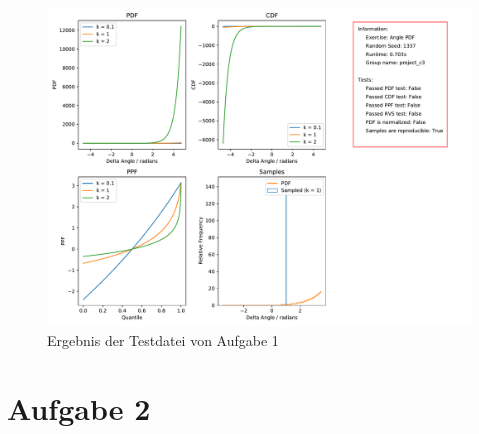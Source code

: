 \documentclass[11pt,a4paper]{article}
\begin{document}
	\begin{figure}[h]

		\centering

		\includegraphics[width=\textwidth]{exercise_angle_pdf.pdf}

		\caption{Ergebnis der Testdatei von Aufgabe 1}

	\end{figure}
\section*{Aufgabe 2}
\end{document}
